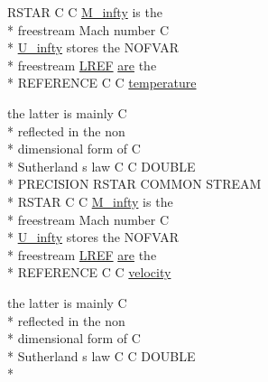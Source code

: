 \begin{DoxyCompactItemize}
R\-S\-T\-A\-R C C \hyperlink{msa20_2home_2abonfi_2_c_f_d__codes_2_eul_f_s_83_82_83_2include_2stream_8com_a57c765efd76d44669f6966962bda2d72}{M\-\_\-infty} is the \\*
freestream Mach number C \\*
\hyperlink{msa20_2home_2abonfi_2_c_f_d__codes_2_eul_f_s_83_82_83_2include_2stream_8com_a3306f725a42d6173548f0867aa4313ef}{U\-\_\-infty} stores the N\-O\-F\-V\-A\-R \\*
freestream \hyperlink{msa20_2home_2abonfi_2_c_f_d__codes_2_eul_f_s_83_82_83_2include_2stream_8com_a19d492a15feda819ed49e580c6a1568f}{L\-R\-E\-F} \hyperlink{msa20_2home_2abonfi_2_c_f_d__codes_2_eul_f_s_83_82_83_2include_2ibc8_8com_a7f7721a0bb3c1d35cfbfbcfd6efc1548}{are} the \\*
R\-E\-F\-E\-R\-E\-N\-C\-E C C \hyperlink{home_2abonfi_2_c_f_d__codes_2_eul_f_s_83_84_2include_2stream_8com_a46fb926ed83966d981ba4bbfd791eaed}{temperature}
\item 
the latter is mainly C \\*
reflected in the non \\*
dimensional form of C \\*
Sutherland s law C C D\-O\-U\-B\-L\-E \\*
P\-R\-E\-C\-I\-S\-I\-O\-N R\-S\-T\-A\-R C\-O\-M\-M\-O\-N S\-T\-R\-E\-A\-M \\*
R\-S\-T\-A\-R C C \hyperlink{msa20_2home_2abonfi_2_c_f_d__codes_2_eul_f_s_83_82_83_2include_2stream_8com_a57c765efd76d44669f6966962bda2d72}{M\-\_\-infty} is the \\*
freestream Mach number C \\*
\hyperlink{msa20_2home_2abonfi_2_c_f_d__codes_2_eul_f_s_83_82_83_2include_2stream_8com_a3306f725a42d6173548f0867aa4313ef}{U\-\_\-infty} stores the N\-O\-F\-V\-A\-R \\*
freestream \hyperlink{msa20_2home_2abonfi_2_c_f_d__codes_2_eul_f_s_83_82_83_2include_2stream_8com_a19d492a15feda819ed49e580c6a1568f}{L\-R\-E\-F} \hyperlink{msa20_2home_2abonfi_2_c_f_d__codes_2_eul_f_s_83_82_83_2include_2ibc8_8com_a7f7721a0bb3c1d35cfbfbcfd6efc1548}{are} the \\*
R\-E\-F\-E\-R\-E\-N\-C\-E C C \hyperlink{home_2abonfi_2_c_f_d__codes_2_eul_f_s_83_84_2include_2stream_8com_a4acbada976d4b32776408b1d1e55321a}{velocity}
\item 
the latter is mainly C \\*
reflected in the non \\*
dimensional form of C \\*
Sutherland s law C C D\-O\-U\-B\-L\-E \\*

\end{DoxyCompactItemize}
